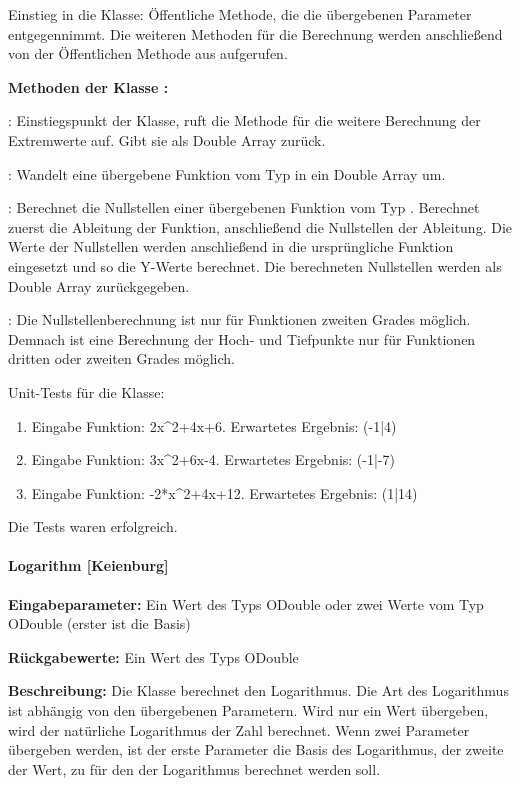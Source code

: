 Einstieg in die Klasse: Öffentliche Methode, die die übergebenen Parameter entgegennimmt. Die weiteren Methoden für die Berechnung werden anschließend von der Öffentlichen Methode aus aufgerufen. 

\textbf{Methoden der Klasse :}

: Einstiegspunkt der Klasse, ruft die Methode  für die weitere Berechnung der Extremwerte auf. Gibt sie als Double Array zurück. 

: Wandelt eine übergebene Funktion vom Typ  in ein Double Array um.

: Berechnet die Nullstellen einer übergebenen Funktion vom Typ . Berechnet zuerst die Ableitung der Funktion, anschließend die Nullstellen der Ableitung. Die Werte der Nullstellen werden anschließend in die ursprüngliche Funktion eingesetzt und so die Y-Werte berechnet. Die berechneten Nullstellen werden als Double Array zurückgegeben. 

: Die Nullstellenberechnung ist nur für Funktionen zweiten Grades möglich. Demnach ist eine Berechnung der Hoch- und Tiefpunkte nur für Funktionen dritten oder zweiten Grades möglich.

Unit-Tests für die Klasse:

\begin{enumerate}
\item Eingabe Funktion: 2x\^{}2+4x+6. Erwartetes Ergebnis: (-1|4)
\item Eingabe Funktion: 3x\^{}2+6x-4. Erwartetes Ergebnis: (-1|-7)
\item Eingabe Funktion: -2*x\^{}2+4x+12. Erwartetes Ergebnis: (1|14)
\end{enumerate}

Die Tests waren erfolgreich.

\paragraph{Logarithm [Keienburg]}

\textbf{Eingabeparameter:} Ein Wert des Typs ODouble oder zwei Werte vom Typ ODouble (erster ist die Basis) 

\textbf{Rückgabewerte:} Ein Wert des Typs ODouble

\textbf{Beschreibung:} Die Klasse berechnet den Logarithmus. Die Art des Logarithmus ist abhängig von den übergebenen Parametern. Wird nur ein Wert übergeben, wird der natürliche Logarithmus der Zahl berechnet. Wenn zwei Parameter übergeben werden, ist der erste Parameter die Basis des Logarithmus, der zweite der Wert, zu für den der Logarithmus berechnet werden soll. 

